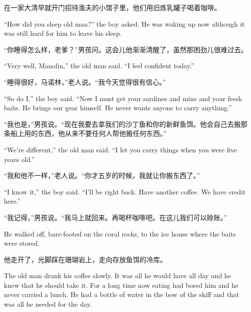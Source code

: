 \begin{paracol}{2}
\switchcolumn

在一家大清早就开门招待渔夫的小馆子里，他们用旧炼乳罐子喝着咖啡。

\switchcolumn*

``How did you sleep old man?'' the boy asked. He was waking up now \gls{although}
it was still hard for him to leave his sleep.

\switchcolumn

“你睡得怎么样，老爹？”男孩问。这会儿他渐渐清醒了，虽然那困劲儿很难过去。

\switchcolumn*

``Very well, Manolin,'' the old man said. ``I feel confident today.''

\switchcolumn

“睡得很好，马诺林，”老人说。“我今天觉得很有信心。”

\switchcolumn*

``So do I,'' the boy said. ``Now I must get your sardines and mine and your
fresh baits. He brings our gear himself. He never wants anyone to carry
anything.''

\switchcolumn

“我也是，”男孩说。“现在我要去拿我们的沙丁鱼和你的新鲜鱼饵。他会自己去搬那条船上用的东西，他从来不要任何人帮他搬任何东西。”

\switchcolumn*

``We're different,'' the old man said. ``I let you carry things when you were five years old.''

\switchcolumn

“我和他不一样，”老人说。“你才五岁的时候，我就让你搬东西了。”

\switchcolumn*

``I know it,'' the boy said. ``I'll be right back. Have another coffee. We have \gls{credit} here.''

\switchcolumn

“我记得，”男孩说。“我马上就回来。再喝杯咖啡吧。在这儿我们可以赊账。”

\switchcolumn*

He walked off, bare-footed on the \gls{coral} rocks, to the ice house where
the baits were stored.

\switchcolumn

他走开了，光脚踩在珊瑚岩上，走向存放鱼饵的冷库。

\switchcolumn*

The old man drank his coffee slowly. It was all he would have all day and he
knew that he should take it. For a long time now eating had bored him and he
never carried a lunch. He had a bottle of water in the bow of the
skiff and that was all he needed for the day.


\end{paracol}
